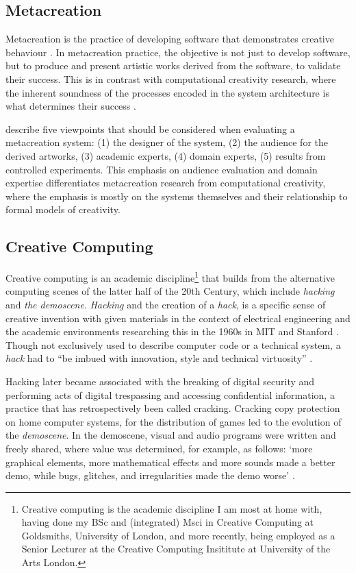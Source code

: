 \subsection{Metacreation}

Metacreation is the practice of developing software that demonstrates creative behaviour \citep{whitelaw2004metacreation}. 
In metacreation practice, the objective is not just to develop software, but to produce and present artistic works derived from the software, to validate their success. 
This is in contrast with computational creativity research, where the inherent soundness of the processes encoded in the system architecture is what determines their success \citep{colton2008creativity}.

\cite{eigenfeldt2012evaluating} describe five viewpoints that should be considered when evaluating a metacreation system: (1) the designer of the system, (2) the audience for the derived artworks, (3) academic experts, (4) domain experts, (5) results from controlled experiments.  
This emphasis on audience evaluation and domain expertise differentiates metacreation research from computational creativity, where the emphasis is mostly on the systems themselves and their relationship to formal models of creativity.

\subsection{Creative Computing}

Creative computing is an academic discipline\footnote{Creative computing is the academic discipline I am most at home with, having done my BSc and (integrated) Msci in Creative Computing at Goldsmiths, University of London, and more recently, being employed as a Senior Lecturer at the Creative Computing Insititute at University of the Arts London.}
that builds from the alternative computing scenes of the latter half of the 20th Century, which include  \textit{hacking} and \textit{the demoscene}. 
\textit{Hacking} and the creation of a \textit{hack}, is a specific sense of creative invention with given materials in the context of electrical engineering and the academic environments researching this in the 1960s in MIT and Stanford \citep{wark2006hackers}. 
Though not exclusively used to describe computer code or a technical system, a \textit{hack} had to ``be imbued with innovation, style and technical virtuosity'' \citep{levy1984hackers}.

Hacking later became associated with the breaking of digital security and performing acts of digital trespassing and accessing confidential information, a practice that has retrospectively been called cracking. 
Cracking copy protection on home computer systems, for the distribution of games led to the evolution of the \textit{demoscene}. 
 In the demoscene, visual and audio programs were written and freely shared, where value was determined, for example, as follows: ‘more graphical elements, more mathematical effects and more sounds made a better demo, while bugs, glitches, and irregularities made the demo worse’  \citep{carlsson2019forgotten}.

